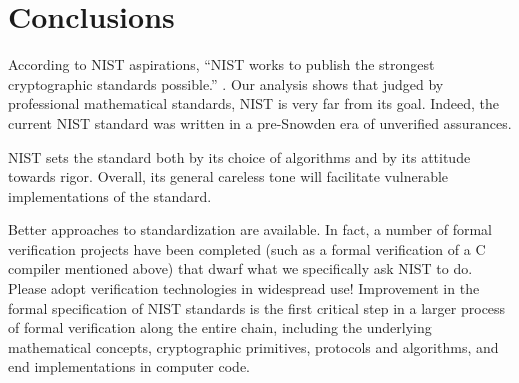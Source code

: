 \documentclass[11pt]{amsart} %
\begin{document}
\section{Conclusions}


According to NIST aspirations,
``NIST works to publish the strongest cryptographic standards possible.'' \cite{NIST-Supp}.
Our analysis shows that judged by professional mathematical standards, NIST is 
very far from its goal. Indeed, the current NIST standard was written in a pre-Snowden era of unverified assurances.

NIST sets the standard both
by its choice of algorithms and by its attitude towards rigor.
Overall,  its general careless tone will 
facilitate vulnerable implementations of the standard.  

Better approaches to standardization are available.  In fact,
a number of formal verification projects have been completed (such as a formal verification of a C compiler
mentioned above) that dwarf what we specifically ask NIST  to do.  Please
adopt verification technologies in widespread use!
Improvement in the formal specification of NIST standards is the first
critical step in a larger process of formal verification along the entire chain, including
the
underlying mathematical concepts, cryptographic primitives, protocols and algorithms, 
and end implementations
in computer code.


 



\end{document}

